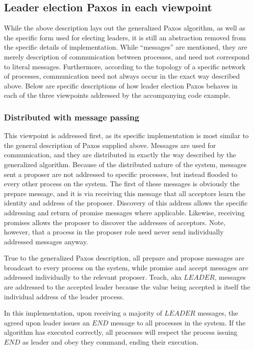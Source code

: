 \documentclass[12pt]{article}
\begin{document}
\subsection{Leader election Paxos in each viewpoint}
While the above description lays out the generalized Paxos algorithm, as well
as the specific form used for electing leaders, it is still an abstraction
removed from the specific details of implementation. While ``messages'' are mentioned,
they are merely description of communication between processes, and need not correspond
to literal messages. Furthermore, according to the topology of a specific network of
processes, communication need not always occur in the exact way described above.
Below are specific descriptions of how leader election Paxos behaves in each of
the three viewpoints addressed by the accompanying code example.

\subsubsection{Distributed with message passing}
This viewpoint is addressed first, as its specific implementation is most similar
to the general description of Paxos supplied above. Messages are used for communication,
and they are distributed in exactly the way described by the generalized algorithm.
Because of the distributed nature of the system, messages sent a proposer are not
addressed to specific processes, but instead flooded to every other process on the system.
The first of these messages is obviously the prepare message, and it is via receiving this message
that all acceptors learn the identity and address of the proposer. Discovery of this address
allows the specific addressing and return of promise messages where applicable. Likewise,
receiving promises allows the proposer to discover the addresses of acceptors. Note, however,
that a process in the proposer role need never send individually addressed messages anyway.

True to the generalized Paxos description, all prepare and propose messages are broadcast
to every process on the system, while promise and accept messages are addressed individually
to the relevant proposer. Teach, aka $LEADER$, messages are addressed to the accepted leader
because the value being accepted is itself the individual address of the leader process.

In this implementation, upon receiving a majority of $LEADER$ messages, the agreed upon leader
issues an $END$ message to all processes in the system. If the algorithm has executed correctly,
all processes will respect the process issuing $END$ as leader and obey they command, ending
their execution.
\end{document}
